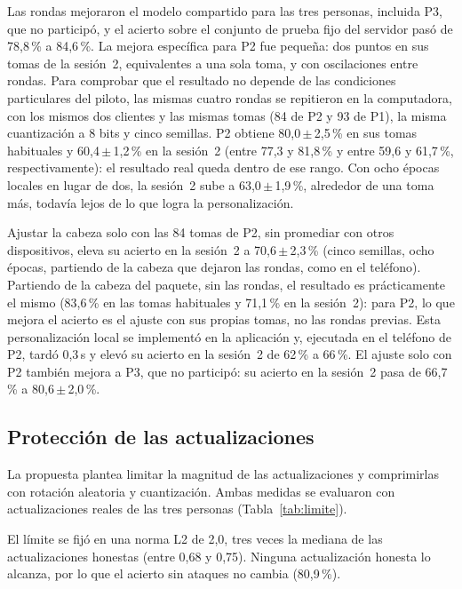 Las rondas mejoraron el modelo compartido para las tres personas, incluida P3, que no participó, y el acierto sobre el conjunto de prueba fijo del servidor pasó de 78,8\,\% a 84,6\,\%. La mejora específica para P2 fue pequeña: dos puntos en sus tomas de la sesión~2, equivalentes a una sola toma, y con oscilaciones entre rondas. Para comprobar que el resultado no depende de las condiciones particulares del piloto, las mismas cuatro rondas se repitieron en la computadora, con los mismos dos clientes y las mismas tomas (84 de P2 y 93 de P1), la misma cuantización a 8 bits y cinco semillas. P2 obtiene 80,0\,$\pm$\,2,5\,\% en sus tomas habituales y 60,4\,$\pm$\,1,2\,\% en la sesión~2 (entre 77,3 y 81,8\,\% y entre 59,6 y 61,7\,\%, respectivamente): el resultado real queda dentro de ese rango. Con ocho épocas locales en lugar de dos, la sesión~2 sube a 63,0\,$\pm$\,1,9\,\%, alrededor de una toma más, todavía lejos de lo que logra la personalización.

Ajustar la cabeza solo con las 84 tomas de P2, sin promediar con otros dispositivos, eleva su acierto en la sesión~2 a 70,6\,$\pm$\,2,3\,\% (cinco semillas, ocho épocas, partiendo de la cabeza que dejaron las rondas, como en el teléfono). Partiendo de la cabeza del paquete, sin las rondas, el resultado es prácticamente el mismo (83,6\,\% en las tomas habituales y 71,1\,\% en la sesión~2): para P2, lo que mejora el acierto es el ajuste con sus propias tomas, no las rondas previas. Esta personalización local se implementó en la aplicación y, ejecutada en el teléfono de P2, tardó 0,3\,s y elevó su acierto en la sesión~2 de 62\,\% a 66\,\%. El ajuste solo con P2 también mejora a P3, que no participó: su acierto en la sesión~2 pasa de 66,7\,\% a 80,6\,$\pm$\,2,0\,\%.

\subsection{Protección de las actualizaciones}

La propuesta plantea limitar la magnitud de las actualizaciones y comprimirlas con rotación aleatoria y cuantización. Ambas medidas se evaluaron con actualizaciones reales de las tres personas (Tabla~\ref{tab:limite}).

El límite se fijó en una norma L2 de 2,0, tres veces la mediana de las actualizaciones honestas (entre 0,68 y 0,75). Ninguna actualización honesta lo alcanza, por lo que el acierto sin ataques no cambia (80,9\,\%).

